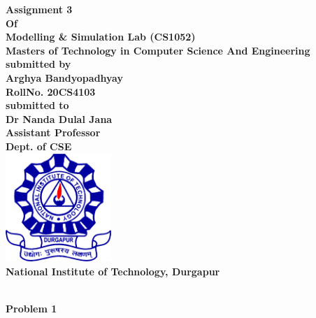 \documentclass[12pt, letterpaper, twoside]{book}
\date{27nd May 2021}
\begin{document}
\begin{titlepage}
	\begin{center}
       \vspace*{5cm}
       \bfseries\Large
    	Assignment 3\\
    	Of\\
    	Modelling \& Simulation Lab (CS1052)\\
        \vskip1cm
        Masters of Technology in Computer Science And Engineering\\
        \vskip1cm
        submitted by\\
    	Arghya Bandyopadhyay\\
    	RollNo. 20CS4103\\
    	\vskip1cm
    	submitted to\\
    	Dr Nanda Dulal Jana\\
    	Assistant Professor\\
    	Dept. of CSE\\
    	\vskip1cm
    	\includegraphics[width=4cm]{NITDGP}\\
    	National Institute of Technology, Durgapur\\
    \end{center}
\end{titlepage}
\begin{center}
\textbf{\\Problem 1}
\end{center}
\end{document}
